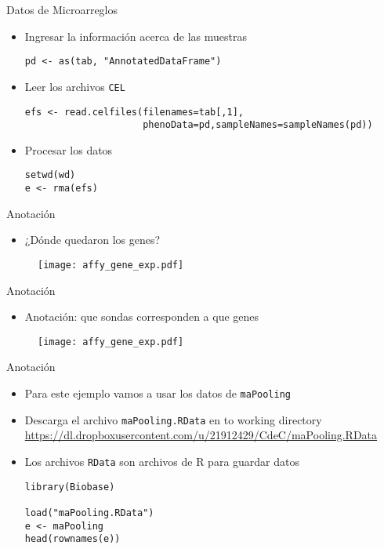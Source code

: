 \documentclass{beamer}
\begin{document}
\begin{frame}[fragile]{Datos de Microarreglos}
\begin{itemize}
\item Ingresar la información acerca de las muestras
\begin{verbatim}
pd <- as(tab, "AnnotatedDataFrame")
\end{verbatim}
\item Leer los archivos \verb=CEL=
\begin{verbatim}
efs <- read.celfiles(filenames=tab[,1],
		             phenoData=pd,sampleNames=sampleNames(pd))
\end{verbatim}
\item Procesar los datos
\begin{verbatim}
setwd(wd)
e <- rma(efs)
\end{verbatim}
\end{itemize}
\end{frame}

\begin{frame}{Anotación}
\begin{itemize}
\item ¿Dónde quedaron los genes?
\end{itemize}
\begin{figure}[H]
\centering
\texttt{[image: affy\_gene\_exp.pdf]}
\end{figure}
\end{frame}

\begin{frame}{Anotación}
\begin{itemize}
\item Anotación: que sondas corresponden a que genes
\end{itemize}
\begin{figure}[H]
\centering
\texttt{[image: affy\_gene\_exp.pdf]}
\end{figure}
\end{frame}


\begin{frame}[fragile]{Anotación}
\begin{itemize}
\item Para este ejemplo vamos a usar los datos de \verb=maPooling=
\item Descarga el archivo \verb=maPooling.RData= en to working directory\\
\url{https://dl.dropboxusercontent.com/u/21912429/CdeC/maPooling.RData}
\item Los archivos \verb=RData= son archivos de R para guardar datos
\begin{verbatim}
library(Biobase)

load("maPooling.RData")
e <- maPooling
head(rownames(e))
\end{verbatim}
\end{itemize}
\end{frame}
\end{document}
